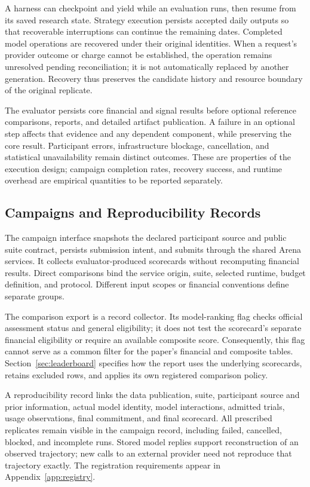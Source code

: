 A harness can checkpoint and yield while an evaluation runs, then resume from its saved research state. Strategy execution persists accepted daily outputs so that recoverable interruptions can continue the remaining dates. Completed model operations are recovered under their original identities. When a request's provider outcome or charge cannot be established, the operation remains unresolved pending reconciliation; it is not automatically replaced by another generation. Recovery thus preserves the candidate history and resource boundary of the original replicate.

The evaluator persists core financial and signal results before optional reference comparisons, reports, and detailed artifact publication. A failure in an optional step affects that evidence and any dependent component, while preserving the core result. Participant errors, infrastructure blockage, cancellation, and statistical unavailability remain distinct outcomes. These are properties of the execution design; campaign completion rates, recovery success, and runtime overhead are empirical quantities to be reported separately.

\subsection{Campaigns and Reproducibility Records}
\label{sec:arena_campaigns}

The campaign interface snapshots the declared participant source and public suite contract, persists submission intent, and submits through the shared Arena services. It collects evaluator-produced scorecards without recomputing financial results. Direct comparisons bind the service origin, suite, selected runtime, budget definition, and protocol. Different input scopes or financial conventions define separate groups.

The comparison export is a record collector. Its model-ranking flag checks official assessment status and general eligibility; it does not test the scorecard's separate financial eligibility or require an available composite score. Consequently, this flag cannot serve as a common filter for the paper's financial and composite tables. Section~\ref{sec:leaderboard} specifies how the report uses the underlying scorecards, retains excluded rows, and applies its own registered comparison policy.

A reproducibility record links the data publication, suite, participant source and prior information, actual model identity, model interactions, admitted trials, usage observations, final commitment, and final scorecard. All prescribed replicates remain visible in the campaign record, including failed, cancelled, blocked, and incomplete runs. Stored model replies support reconstruction of an observed trajectory; new calls to an external provider need not reproduce that trajectory exactly. The registration requirements appear in Appendix~\ref{app:registry}.
